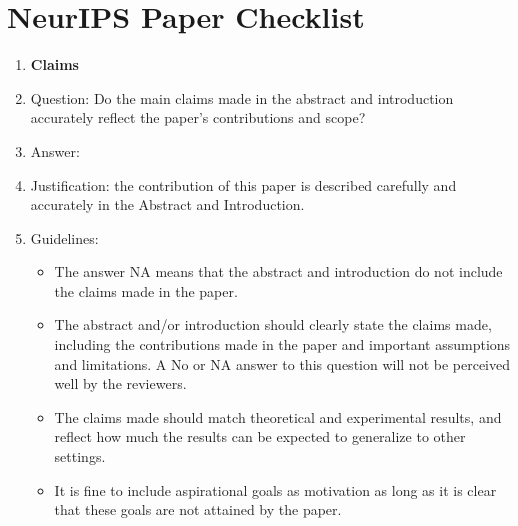 \documentclass{article}
\theoremstyle{plain}
\theoremstyle{definition}
\theoremstyle{remark}
\begin{document}

\newpage
\section*{NeurIPS Paper Checklist}
\begin{enumerate}

\item {\bf Claims}
    \item[] Question: Do the main claims made in the abstract and introduction accurately reflect the paper's contributions and scope?
    \item[] Answer: \answerYes{} %
    \item[] Justification: the contribution of this paper is described carefully and accurately in the Abstract and Introduction. 
    \item[] Guidelines:
    \begin{itemize}
        \item The answer NA means that the abstract and introduction do not include the claims made in the paper.
        \item The abstract and/or introduction should clearly state the claims made, including the contributions made in the paper and important assumptions and limitations. A No or NA answer to this question will not be perceived well by the reviewers. 
        \item The claims made should match theoretical and experimental results, and reflect how much the results can be expected to generalize to other settings. 
        \item It is fine to include aspirational goals as motivation as long as it is clear that these goals are not attained by the paper. 
    \end{itemize}


\end{enumerate}
\end{document}
